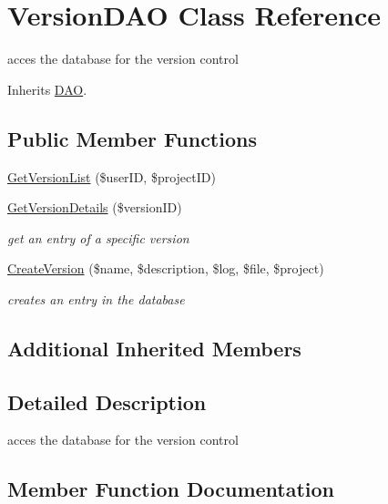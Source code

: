\hypertarget{class_version_d_a_o}{}\section{Version\+D\+AO Class Reference}
\label{class_version_d_a_o}


acces the database for the version control  




Inherits \hyperlink{class_d_a_o}{D\+AO}.

\subsection*{Public Member Functions}
\begin{DoxyCompactItemize}
\item 
\hyperlink{class_version_d_a_o_a71cc9114947647898cf8638b38b10de3}{Get\+Version\+List} (\$user\+ID, \$project\+ID)
\item 
\hyperlink{class_version_d_a_o_ab23f1c102111f11f857f20da388ece28}{Get\+Version\+Details} (\$version\+ID)
\begin{DoxyCompactList}\small\item\em get an entry of a specific version \end{DoxyCompactList}\item 
\hyperlink{class_version_d_a_o_a4d1f9b80ef1a9600b33de9bebf6b01f4}{Create\+Version} (\$name, \$description, \$log, \$file, \$project)
\begin{DoxyCompactList}\small\item\em creates an entry in the database \end{DoxyCompactList}\end{DoxyCompactItemize}
\subsection*{Additional Inherited Members}


\subsection{Detailed Description}
acces the database for the version control 

\subsection{Member Function Documentation}
\mbox{\label{class_version_d_a_o_a4d1f9b80ef1a9600b33de9bebf6b01f4}} 
